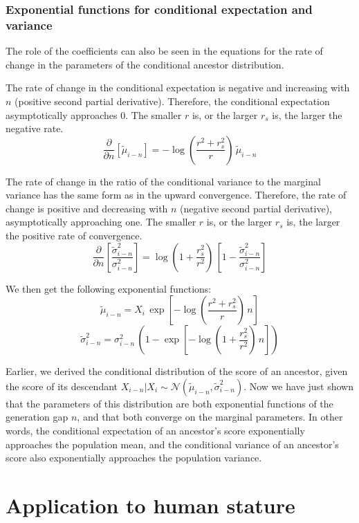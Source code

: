 \documentclass[letterpaper,10pt]{article} %
\begin{document}
\subsubsection*{Exponential functions for conditional expectation and variance}
The role of the coefficients can also be seen in the equations for the rate of change in the parameters of the conditional ancestor distribution.

The rate of change in the conditional expectation is negative and increasing with $n$ (positive second partial derivative). Therefore, the conditional expectation asymptotically approaches $0$. The smaller $r$ is, or the larger $r_s$ is, the larger the negative rate. 
$$\frac{\partial}{\partial n}[\tilde{\mu}_{i-n}] = -\log(\frac{r^2 + r_s^2}{r}) \, \tilde{\mu}_{i-n}$$

The rate of change in the ratio of the conditional variance to the marginal variance has the same form as in the upward convergence. Therefore, the rate of change is positive and decreasing with $n$ (negative second partial derivative), asymptotically approaching one. The smaller $r$ is, or the larger $r_s$ is, the larger the positive rate of convergence.
$$\frac{\partial }{\partial n}[\frac{\tilde{\sigma}_{i-n}^2}{\sigma_{i-n}^2}] = \log(1+\frac{r_s^2}{r^2}) \, [1 - \frac{\tilde{\sigma}_{i-n}^2}{\sigma_{i-n}^2}]$$

We then get the following exponential functions:
$$\tilde{\mu}_{i-n} = X_i \, \exp[-\log(\frac{r^2 + r_s^2}{r}) \, n]$$
$$\tilde{\sigma}_{i-n}^2 = \sigma_{i-n}^2 \, (1 - \exp[-\log(1+\frac{r_s^2}{r^2}) \, n])$$

Earlier, we derived the conditional distribution of the score of an ancestor, given the score of its descendant $X_{i-n}|X_i \sim \mathcal{N}( \tilde{\mu}_{i-n}, \tilde{\sigma}_{i-n}^2)$. Now we have just shown that the parameters of this distribution are both exponential functions of the generation gap $n$, and that both converge on the marginal parameters. In other words, the conditional expectation of an ancestor's score exponentially approaches the population mean, and the conditional variance of an ancestor's score also exponentially approaches the population variance. 









\section{Application to human stature}
\end{document}
